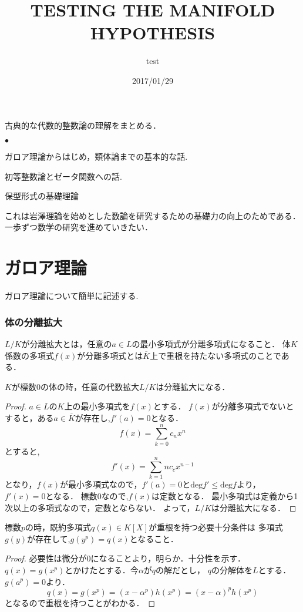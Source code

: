 \documentclass{ujarticle}
\title{TESTING THE MANIFOLD HYPOTHESIS}
\author{test}
\date{2017/01/29}
\renewenvironment{itemize}%
{%
   \begin{list}{\parbox{1zw}{$\bullet$}}%
   {%
      \setlength{\topsep}{0zh}
      \setlength{\itemindent}{0zw}
      \setlength{\leftmargin}{2zw}%
      \setlength{\rightmargin}{0zw}%
      \setlength{\labelsep}{1zw}%
      \setlength{\labelwidth}{3zw}%
      \setlength{\itemsep}{0em}%
      \setlength{\parsep}{0em}%
      \setlength{\listparindent}{0zw}%
   }
}{%
   \end{list}%
}
\begin{document}
  古典的な代数的整数論の理解をまとめる．
  \begin{itemize}
    \item ガロア理論からはじめ，類体論までの基本的な話.
    \item 初等整数論とゼータ関数への話.
    \item 保型形式の基礎理論
  \end{itemize}
これは岩澤理論を始めとした数論を研究するための基礎力の向上のためである．
一歩ずつ数学の研究を進めていきたい．

\section{ガロア理論}
\label{sec:ガロア理論}
ガロア理論について簡単に記述する.

\subsubsection{体の分離拡大}
\label{sub:体の分離拡大}
\begin{dfn}
 $L/K$が分離拡大とは，任意の$a \in L$の最小多項式が分離多項式になること．
 体$K$係数の多項式$f(x)$が分離多項式とは$\overline{K}$上で重根を持たない多項式のことである．
\end{dfn}

\begin{prop}
 $K$が標数$0$の体の時，任意の代数拡大$L/K$は分離拡大になる．
\end{prop}
\begin{proof}
  $a \in L$の$K$上の最小多項式を$f(x)$とする．
  $f(x)$が分離多項式でないとすると，ある$a \in \overline{K}$が存在し,$f'(a)=0$となる．
  \begin{equation*}
   f(x)=\sum_{k=0}^n c_nx^n
  \end{equation*}
  とすると,
  \begin{equation*}
   f'(x)=\sum_{k=1}^n nc_cx^{n-1}
  \end{equation*}
  となり，$f(x)$が最小多項式なので，$f'(a)=0$と$\mathrm{deg}f' \le \mathrm{deg}f$より，$f'(x)=0$となる．
  標数$0$なので,$f(x)$は定数となる．
  最小多項式は定義から1次以上の多項式なので，定数とならない．
  よって，$L/K$は分離拡大になる．
\end{proof}

\begin{prop}
  標数$p$の時，既約多項式$q(x) \in K[X]$が重根を持つ必要十分条件は
  多項式$g(y)$が存在して,$g(y^p)=q(x)$となること．
\end{prop}
\begin{proof}
  必要性は微分が$0$になることより，明らか．十分性を示す．
  $q(x)=g(x^p)$とかけたとする．今$ \alpha$が$q$の解だとし，
  $q$の分解体を$L$とする．$g(a^p)=0$より．
  \begin{equation*}
   q(x)=g(x^p)=(x-\alpha^p)h(x^p)=(x-\alpha)^ph(x^p)
  \end{equation*}
  となるので重根を持つことがわかる．
\end{proof}
\end{document}

